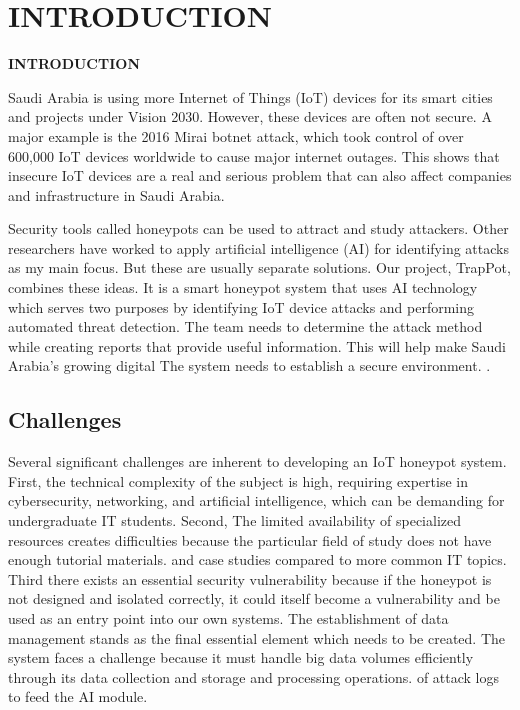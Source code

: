 \chapter{INTRODUCTION}
\pagebreak

\begin{center}
{\LARGE\textbf{INTRODUCTION}}
\end{center}


Saudi Arabia is using more Internet of Things (IoT) devices for its smart cities and projects under Vision 2030. However, these devices are often not secure. A major example is the 2016 Mirai botnet attack, which took control of over 600,000 IoT devices worldwide to cause major internet outages. This shows that insecure IoT devices are a real and serious problem that can also affect companies and infrastructure in Saudi Arabia.

Security tools called honeypots can be used to attract and study attackers. Other researchers have worked to apply artificial intelligence (AI) for identifying attacks as my main focus. But these are usually separate solutions. Our project, TrapPot, combines these ideas. It is a smart honeypot system that uses AI technology which serves two purposes by identifying IoT device attacks and performing automated threat detection.
The team needs to determine the attack method while creating reports that provide useful information. This will help make Saudi Arabia’s growing digital The system needs to establish a secure environment. \cite{203628}.

\section{Challenges}
\label{sec:challenges}


Several significant challenges are inherent to developing an IoT honeypot system. First, the technical complexity of the subject is high, requiring expertise in cybersecurity, networking, and artificial intelligence, which can be demanding for undergraduate IT students. Second, The limited availability of specialized resources creates difficulties because the particular field of study does not have enough tutorial materials. and case studies compared to more common IT topics. Third there exists an essential security vulnerability because if the honeypot is not designed and isolated correctly, it could itself become a vulnerability and be used as an entry point into our own systems. The establishment of data management stands as the final essential element which needs to be created. The system faces a challenge because it must handle big data volumes efficiently through its data collection and storage and processing operations. of attack logs to feed the AI module.

